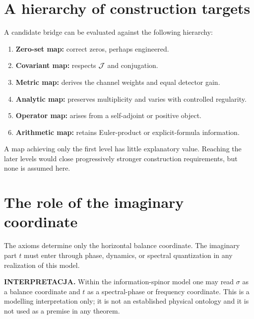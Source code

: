 \section{A hierarchy of construction targets}

A candidate bridge can be evaluated against the following hierarchy:
\begin{enumerate}
  \item \textbf{Zero-set map:} correct zeros, perhaps engineered.
  \item \textbf{Covariant map:} respects $\mathcal{J}$ and conjugation.
  \item \textbf{Metric map:} derives the channel weights and equal detector gain.
  \item \textbf{Analytic map:} preserves multiplicity and varies with controlled regularity.
  \item \textbf{Operator map:} arises from a self-adjoint or positive object.
  \item \textbf{Arithmetic map:} retains Euler-product or explicit-formula information.
\end{enumerate}
A map achieving only the first level has little explanatory value. Reaching the later levels would close progressively stronger construction requirements, but none is assumed here.

\section{The role of the imaginary coordinate}

The axioms determine only the horizontal balance coordinate. The imaginary part $t$ must enter through phase, dynamics, or spectral quantization in any realization of this model.

\textbf{INTERPRETACJA.} Within the information-spinor model one may read $\sigma$ as a balance coordinate and $t$ as a spectral-phase or frequency coordinate. This is a modelling interpretation only; it is not an established physical ontology and it is not used as a premise in any theorem.

